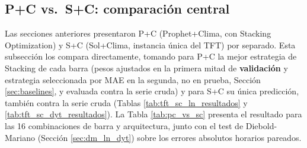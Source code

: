 \subsection{P+C vs.\ S+C: comparación central}
\label{sec:pc_vs_sc}

Las secciones anteriores presentaron P+C (Prophet+Clima, con Stacking Optimization) y S+C (Sol+Clima, instancia única del TFT) por separado. Esta subsección los compara directamente, tomando para P+C la mejor estrategia de Stacking de cada barra (pesos ajustados en la primera mitad de \textbf{validación} y estrategia seleccionada por MAE en la segunda, no en prueba, Sección \ref{sec:baselines}, y evaluada contra la serie cruda) y para S+C su única predicción, también contra la serie cruda (Tablas \ref{tab:tft_sc_ln_resultados} y \ref{tab:tft_sc_dyt_resultados}). La Tabla \ref{tab:pc_vs_sc} presenta el resultado para las 16 combinaciones de barra y arquitectura, junto con el test de Diebold-Mariano (Sección \ref{sec:dm_ln_dyt}) sobre los errores absolutos horarios pareados.

